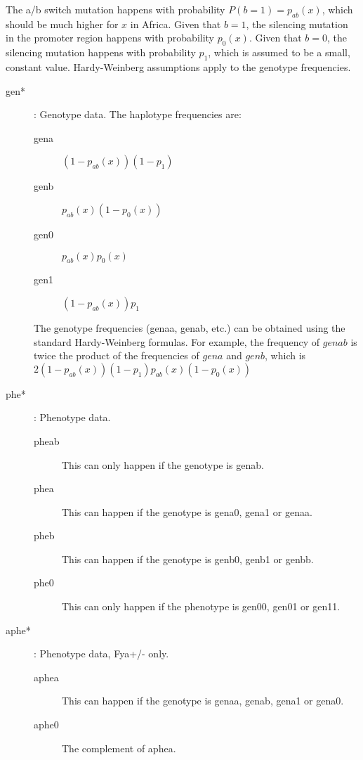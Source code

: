 The a/b switch mutation happens with probability $P(b=1)=p_{ab}(x)$, which should be much higher for $x$ in Africa. Given that $b=1$, the silencing mutation in the promoter region happens with probability $p_0(x)$. Given that $b=0$, the silencing mutation happens with probability $p_1$, which is assumed to be a small, constant value. Hardy-Weinberg assumptions apply to the genotype frequencies.
\begin{description}
    \item[gen*]: Genotype data. The haplotype frequencies are:
    \begin{description}
        \item[gena] $(1-p_{ab}(x))(1-p_1)$
        \item[genb] $p_{ab}(x)(1-p_0(x))$ 
        \item[gen0] $p_{ab}(x)p_0(x)$
        \item[gen1] $(1-p_{ab}(x))p_1$
    \end{description}
    The genotype frequencies (genaa, genab, etc.) can be obtained using the standard Hardy-Weinberg formulas. For example, the frequency of $genab$ is twice the product of the frequencies of $gena$ and $genb$, which is $2(1-p_{ab}(x))(1-p_1)p_{ab}(x)(1-p_0(x))$
    \item[phe*]: Phenotype data.
    \begin{description}
        \item[pheab] This can only happen if the genotype is genab.
        \item[phea] This can happen if the genotype is gena0, gena1 or genaa.
        \item[pheb] This can happen if the genotype is genb0, genb1 or genbb.
        \item[phe0] This can only happen if the phenotype is gen00, gen01 or gen11.
    \end{description}
    \item[aphe*]: Phenotype data, Fya+/- only.
    \begin{description}
        \item[aphea] This can happen if the genotype is genaa, genab, gena1 or gena0.
        \item[aphe0] The complement of aphea.

\end{description}
\end{description}
